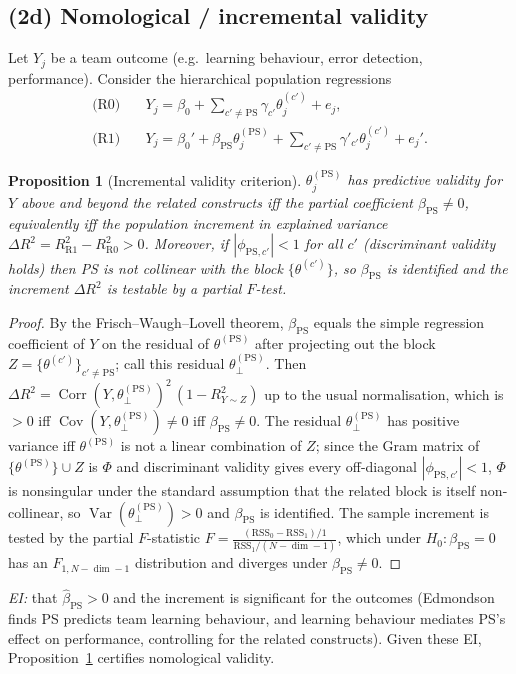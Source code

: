 \documentclass{amsart}
\newtheorem{proposition}{Proposition}
\theoremstyle{remark}
\begin{document}
\subsection{(2d) Nomological / incremental validity}\label{sec:nomo}
Let $Y_j$ be a team outcome (e.g.\ learning behaviour, error detection,
performance). Consider the hierarchical population regressions
\begin{align}
\text{(R0)}\quad & Y_j=\beta_0+\textstyle\sum_{c'\neq\mathrm{PS}}\gamma_{c'}\theta^{(c')}_j+e_j,\\
\text{(R1)}\quad & Y_j=\beta_0'+\beta_{\mathrm{PS}}\theta^{(\mathrm{PS})}_j
+\textstyle\sum_{c'\neq\mathrm{PS}}\gamma'_{c'}\theta^{(c')}_j+e_j'.
\end{align}

\begin{proposition}[Incremental validity criterion]\label{prop:incr}
$\theta^{(\mathrm{PS})}_j$ has predictive validity for $Y$ \emph{above and beyond}
the related constructs iff the partial coefficient $\beta_{\mathrm{PS}}\neq0$,
equivalently iff the population increment in explained variance
$\Delta R^2=R^2_{\mathrm{R1}}-R^2_{\mathrm{R0}}>0$. Moreover, if
$|\phi_{\mathrm{PS},c'}|<1$ for all $c'$ (discriminant validity holds) then PS is
not collinear with the block $\{\theta^{(c')}\}$, so $\beta_{\mathrm{PS}}$ is
identified and the increment $\Delta R^2$ is testable by a partial $F$-test.
\end{proposition}
\begin{proof}
By the Frisch--Waugh--Lovell theorem, $\beta_{\mathrm{PS}}$ equals the simple
regression coefficient of $Y$ on the residual of $\theta^{(\mathrm{PS})}$ after
projecting out the block $Z=\{\theta^{(c')}\}_{c'\neq\mathrm{PS}}$; call this
residual $\theta^{(\mathrm{PS})}_{\perp}$. Then
$\Delta R^2=\operatorname{Corr}(Y,\theta^{(\mathrm{PS})}_\perp)^2\,(1-R^2_{Y\sim Z})$ up to the
usual normalisation, which is $>0$ iff
$\operatorname{Cov}(Y,\theta^{(\mathrm{PS})}_\perp)\neq0$ iff $\beta_{\mathrm{PS}}\neq0$. The
residual $\theta^{(\mathrm{PS})}_\perp$ has positive variance iff
$\theta^{(\mathrm{PS})}$ is not a linear combination of $Z$; since the Gram matrix
of $\{\theta^{(\mathrm{PS})}\}\cup Z$ is $\Phi$ and discriminant validity gives every
off-diagonal $|\phi_{\mathrm{PS},c'}|<1$, $\Phi$ is nonsingular under the standard
assumption that the related block is itself non-collinear, so
$\operatorname{Var}(\theta^{(\mathrm{PS})}_\perp)>0$ and $\beta_{\mathrm{PS}}$ is identified. The
sample increment is tested by the partial $F$-statistic
$F=\frac{(\mathrm{RSS}_0-\mathrm{RSS}_1)/1}{\mathrm{RSS}_1/(N-\dim-1)}$, which under
$H_0:\beta_{\mathrm{PS}}=0$ has an $F_{1,N-\dim-1}$ distribution and diverges under
$\beta_{\mathrm{PS}}\neq0$. \end{proof}
\emph{EI:} that $\hat\beta_{\mathrm{PS}}>0$ and the increment is significant for
the outcomes (Edmondson finds PS predicts team learning behaviour, and learning
behaviour mediates PS's effect on performance, controlling for the related
constructs). Given these EI, Proposition~\ref{prop:incr} certifies nomological
validity.
\end{document}
